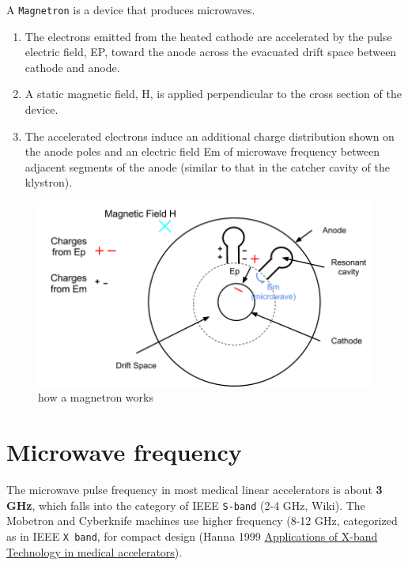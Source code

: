 \documentclass[]{book}
\providecommand{\tightlist}{%
  \setlength{\itemsep}{0pt}\setlength{\parskip}{0pt}}
\theoremstyle{definition}
\theoremstyle{definition}
\theoremstyle{definition}
\theoremstyle{remark}
\begin{document}
A \texttt{Magnetron} is a device that produces microwaves.

\begin{enumerate}
\def\labelenumi{\arabic{enumi}.}
\tightlist
\item
  The electrons emitted from the heated cathode are accelerated by the
  pulse electric field, EP, toward the anode across the evacuated drift
  space between cathode and anode.
\item
  A static magnetic field, H, is applied perpendicular to the cross
  section of the device.
\item
  The accelerated electrons induce an additional charge distribution
  shown on the anode poles and an electric field Em of microwave
  frequency between adjacent segments of the anode (similar to that in
  the catcher cavity of the klystron).
\end{enumerate}

\begin{figure}

{\centering \includegraphics[width=5.82in]{figures/magnetron} 

}

\caption{how a magnetron works}\label{fig:unnamed-chunk-7}
\end{figure}

\section{Microwave frequency}\label{microwave-frequency}

The microwave pulse frequency in most medical linear accelerators is
about \textbf{3 GHz}, which falls into the category of IEEE
\texttt{S-band} (2-4 GHz, Wiki). The Mobetron and Cyberknife machines
use higher frequency (8-12 GHz, categorized as in IEEE \texttt{X\ band},
for compact design (Hanna 1999
\href{https://accelconf.web.cern.ch/AccelConf/p99/PAPERS/WEP114.PDF}{Applications
of X-band Technology in medical accelerators}).
\end{document}

